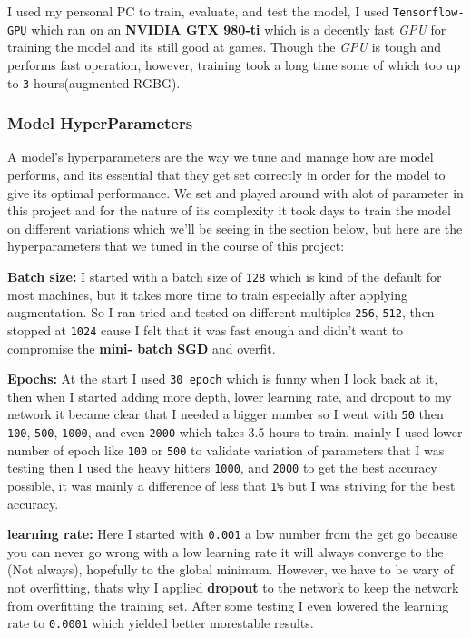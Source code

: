 \documentclass[11pt]{article}
\begin{document}
I used my personal PC to train, evaluate, and test the model, I used
\texttt{Tensorflow-GPU} which ran on an \textbf{NVIDIA GTX 980-ti} which
is a decently fast \emph{GPU} for training the model and its still good
at games. Though the \emph{GPU} is tough and performs fast operation,
however, training took a long time some of which too up to \texttt{3}
hours(augmented RGBG).

\hypertarget{model-hyperparameters}{%
\subsubsection{Model HyperParameters}\label{model-hyperparameters}}

A model's hyperparameters are the way we tune and manage how are model
performs, and its essential that they get set correctly in order for the
model to give its optimal performance. We set and played around with
alot of parameter in this project and for the nature of its complexity
it took days to train the model on different variations which we'll be
seeing in the section below, but here are the hyperparameters that we
tuned in the course of this project:

\textbf{Batch size:} I started with a batch size of \texttt{128} which
is kind of the default for most machines, but it takes more time to
train especially after applying augmentation. So I ran tried and tested
on different multiples \texttt{256}, \texttt{512}, then stopped at
\texttt{1024} cause I felt that it was fast enough and didn't want to
compromise the \textbf{mini- batch SGD} and overfit.

\textbf{Epochs:} At the start I used \texttt{30\ epoch} which is funny
when I look back at it, then when I started adding more depth, lower
learning rate, and dropout to my network it became clear that I needed a
bigger number so I went with \texttt{50} then \texttt{100},
\texttt{500}, \texttt{1000}, and even \texttt{2000} which takes 3.5
hours to train. mainly I used lower number of epoch like \texttt{100} or
\texttt{500} to validate variation of parameters that I was testing then
I used the heavy hitters \texttt{1000}, and \texttt{2000} to get the
best accuracy possible, it was mainly a difference of less that
\texttt{1\%} but I was striving for the best accuracy.

\textbf{learning rate:} Here I started with \texttt{0.001} a low number
from the get go because you can never go wrong with a low learning rate
it will always converge to the (Not always), hopefully to the global
minimum. However, we have to be wary of not overfitting, thats why I
applied \textbf{dropout} to the network to keep the network from
overfitting the training set. After some testing I even lowered the
learning rate to \texttt{0.0001} which yielded better morestable
results.
\end{document}

